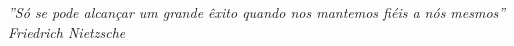\begin{epigrafe}
    \vspace*{\fill}
    \begin{flushright}
        \textit{''Só se pode alcançar um grande êxito quando nos mantemos fiéis a nós mesmos'' \\
        Friedrich Nietzsche}
    \end{flushright}
\end{epigrafe}